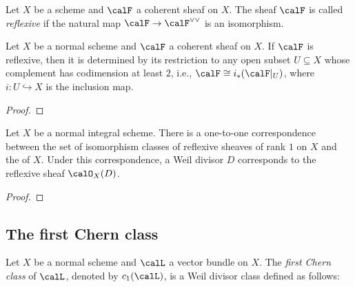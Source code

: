     \begin{definition}\label{def:reflexive_sheaves}
        Let \(X\) be a scheme and \(\calF\) a coherent sheaf on \(X\).
        The sheaf \(\calF\) is called \emph{reflexive} if the natural map \(\calF \to \calF^{\vee\vee}\) is an isomorphism.
    \end{definition}

    \begin{proposition}\label{prop:reflexive_sheaf_determined_by_codimension_locus}
        Let \(X\) be a normal scheme and \(\calF\) a coherent sheaf on \(X\).
        If \(\calF\) is reflexive, then it is determined by its restriction to any open subset \(U \subseteq X\) whose complement has codimension at least \(2\), i.e., \(\calF \cong i_* (\calF|_U)\), where \(i: U \hookrightarrow X\) is the inclusion map.
    \end{proposition}
    \begin{proof}
    \end{proof}

    \begin{theorem}\label{thm:reflexive_sheaves_of_rank_1_and_Weil_divisors_class_group}
        Let \(X\) be a normal integral scheme.
        There is a one-to-one correspondence between the set of isomorphism classes of reflexive sheaves of rank \(1\) on \(X\) and the  of \(X\).
        Under this correspondence, a Weil divisor \(D\) corresponds to the reflexive sheaf \(\calO_X(D)\).
    \end{theorem}
    \begin{proof}
    \end{proof}


\subsection{The first Chern class}

    \begin{definition}\label{def:first_chern_class_vector_bundles}
        Let \(X\) be a normal scheme and \(\calL\) a vector bundle on \(X\).
        The \emph{first Chern class} of \(\calL\), denoted by \(c_1(\calL)\), is a Weil divisor class defined as follows:
        
    \end{definition}

